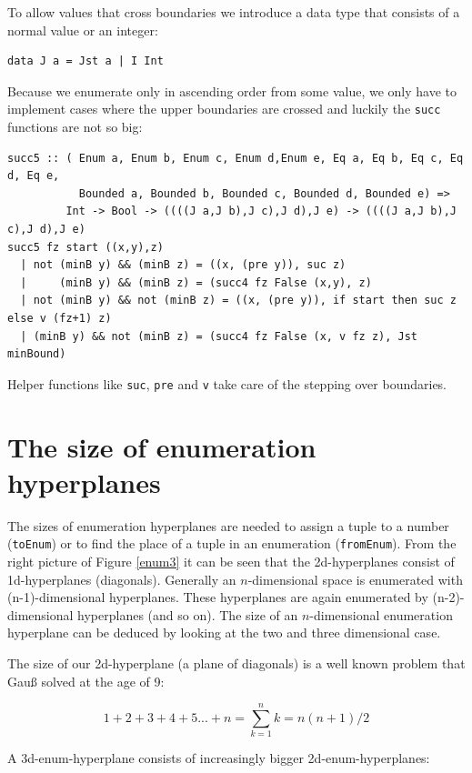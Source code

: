 \documentclass{tmr}
\begin{document}
To allow values that cross boundaries we introduce a data type that consists of a normal value or an integer:
\begin{Verbatim}
data J a = Jst a | I Int
\end{Verbatim}
Because we enumerate only in ascending order from some value, we only have to implement cases where the upper boundaries are crossed and luckily the \verb|succ| functions are not so big:

\begin{Verbatim}
succ5 :: ( Enum a, Enum b, Enum c, Enum d,Enum e, Eq a, Eq b, Eq c, Eq d, Eq e,
           Bounded a, Bounded b, Bounded c, Bounded d, Bounded e) =>
         Int -> Bool -> ((((J a,J b),J c),J d),J e) -> ((((J a,J b),J c),J d),J e)
succ5 fz start ((x,y),z)
  | not (minB y) && (minB z) = ((x, (pre y)), suc z)
  |     (minB y) && (minB z) = (succ4 fz False (x,y), z)
  | not (minB y) && not (minB z) = ((x, (pre y)), if start then suc z else v (fz+1) z)
  | (minB y) && not (minB z) = (succ4 fz False (x, v fz z), Jst minBound)
\end{Verbatim}
Helper functions like \verb|suc|, \verb|pre| and \verb|v| take care of the stepping over boundaries.

\section { The size of enumeration hyperplanes }

The sizes of enumeration hyperplanes are needed to assign a tuple to a number (\verb|toEnum|) or to find the place of a tuple in an enumeration  (\verb|fromEnum|).  From the right picture of Figure \ref{enum3} it can be seen that the 2d-hyperplanes consist of 1d-hyperplanes (diagonals).  Generally an $n$-dimensional space is enumerated with (n-1)-dimensional hyperplanes. These hyperplanes are again enumerated by (n-2)-dimensional hyperplanes (and so on). The size of an $n$-dimensional enumeration hyperplane can be deduced by looking at the two and three dimensional case.

The size of our 2d-hyperplane (a plane of diagonals) is a well known problem that Gauß solved at the age of 9:

\begin{equation}\label{gauss}
 1+2+3+4+5 ... + n  = \sum_{k=1}^{n} k =  n (n+1)/2
\end{equation}

A 3d-enum-hyperplane consists of increasingly bigger 2d-enum-hyperplanes:
\end{document}
